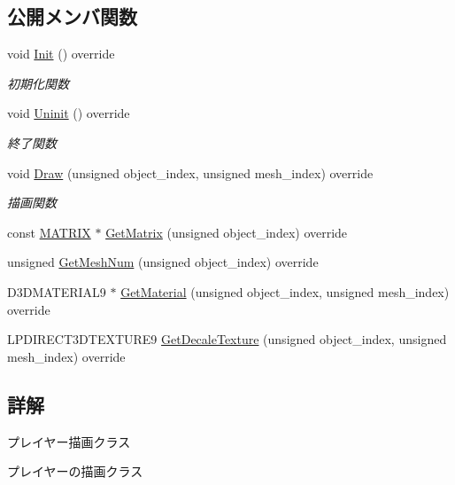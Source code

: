 \subsection*{公開メンバ関数}
\begin{DoxyCompactItemize}
\item 
void \mbox{\hyperlink{class_sky_dome_draw_a5b82e8b650a20dbc0b7ed720d1fb7fab}{Init}} () override
\begin{DoxyCompactList}\small\item\em 初期化関数 \end{DoxyCompactList}\item 
void \mbox{\hyperlink{class_sky_dome_draw_aee1c6b102a97033073b2559b8c2c328b}{Uninit}} () override
\begin{DoxyCompactList}\small\item\em 終了関数 \end{DoxyCompactList}\item 
void \mbox{\hyperlink{class_sky_dome_draw_a42364ea42618cbab588d55050edfe95a}{Draw}} (unsigned object\+\_\+index, unsigned mesh\+\_\+index) override
\begin{DoxyCompactList}\small\item\em 描画関数 \end{DoxyCompactList}\item 
const \mbox{\hyperlink{_vector3_d_8h_a032295cd9fb1b711757c90667278e744}{M\+A\+T\+R\+IX}} $\ast$ \mbox{\hyperlink{class_sky_dome_draw_ab947a3d43975a6d95149bc112c08ce05}{Get\+Matrix}} (unsigned object\+\_\+index) override
\item 
unsigned \mbox{\hyperlink{class_sky_dome_draw_a7ecd8d4b987e4d58a247d3438a45f9d4}{Get\+Mesh\+Num}} (unsigned object\+\_\+index) override
\item 
D3\+D\+M\+A\+T\+E\+R\+I\+A\+L9 $\ast$ \mbox{\hyperlink{class_sky_dome_draw_acbc487d912b464474ae6f1afd7d6bb74}{Get\+Material}} (unsigned object\+\_\+index, unsigned mesh\+\_\+index) override
\item 
L\+P\+D\+I\+R\+E\+C\+T3\+D\+T\+E\+X\+T\+U\+R\+E9 \mbox{\hyperlink{class_sky_dome_draw_a1d708782f13648724e423d1dca22b213}{Get\+Decale\+Texture}} (unsigned object\+\_\+index, unsigned mesh\+\_\+index) override
\end{DoxyCompactItemize}


\subsection{詳解}
プレイヤー描画クラス 

プレイヤーの描画クラス 

